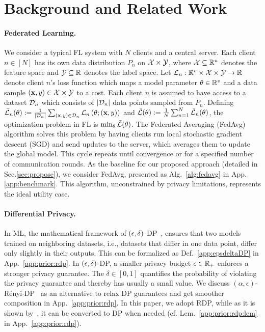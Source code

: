 \section{Background and Related Work}\label{sec:back}

\paragraph{Federated Learning.}
We consider a typical FL system with $N$ clients and a central server. Each client $n \in [N]$ has its own data distribution $P_n$ on ${\mathcal{X}}\times{\mathcal{Y}}$, where ${\mathcal{X}} \subseteq {\mathbb{R}}^u$ denotes the feature space and ${\mathcal{Y}}\subseteq {\mathbb{R}}$ denotes the label space. Let ${\mathcal{L}}_n:{\mathbb{R}}^v \times {\mathcal{X}}\times{\mathcal{Y}} \rightarrow {\mathbb{R}}$ denote client $n$'s loss function which maps a model parameter ${\theta}\in {\mathbb{R}}^v$ and a data sample $({\mathbf{x}},y)\in {\mathcal{X}}\times{\mathcal{Y}}$ to a cost. 
Each client $n$ is assumed to have access to a dataset $\mathcal{D}_n$ which consists of $\left|\mathcal{D}_n\right|$ data points sampled from $P_n$. Defining $\bar{{\mathcal{L}}}_n({\theta}):= \frac{1}{\left| \mathcal{D}_n\right|}\sum_{({\mathbf{x}},y)\in \mathcal{D}_n} {\mathcal{L}}_n\left({\theta};({\mathbf{x}},y) \right)$ and $\bar{{\mathcal{L}}}({\theta}) := \frac{1}{N} \sum_{n=1}^N \bar{{\mathcal{L}}}_n({\theta})$, the optimization problem in FL is $\min_{{\theta}} \bar{{\mathcal{L}}}({\theta})$. The Federated Averaging (FedAvg)~\citep{mcmahan2017communication} algorithm solves this problem by having clients run local stochastic gradient descent (SGD) and send updates to the server, which averages them to update the global model. This cycle repeats until convergence or for a specified number of communication rounds. %
{As the baseline for our proposed approach (detailed in Sec.\ref{sec:propose}), we consider FedAvg, presented as Alg.~\ref{alg:fedavg} in App.\ref{app:benchmark}. This algorithm, unconstrained by privacy limitations, represents the ideal utility case.}


\paragraph{Differential Privacy.}
In ML, the mathematical framework of $({\epsilon},\delta)$-DP~\citep{dwork2014algorithmic}, ensures that two models trained on neighboring datasets, i.e., datasets that differ in one data point, differ only slightly in their outputs. %
{This can be formalized as Def.~\ref{app:epsdeltaDP} in App.~\ref{app:prior:rdp}.} 
In $({\epsilon},\delta)$-DP, a smaller privacy budget ${\epsilon} \in {\mathbb{R}}_{+}$ enforces a stronger privacy guarantee. The $\delta\in [0,1]$ quantifies the probability of violating the privacy guarantee and thereby has usually a small value. 
We discuss $(\alpha, \epsilon)$-Rényi-DP~\citep{mironov2017renyi} as an alternative to relax DP guarantees and get smoother composition in App.~\ref{app:prior:rdp}. In this paper, we adopt RDP, while as it is shown by~\citep{mironov2017renyi}, it can be converted to DP when needed (cf. Lem.~\ref{app:prior:rdp:lem} in App.~\ref{app:prior:rdp}). 


